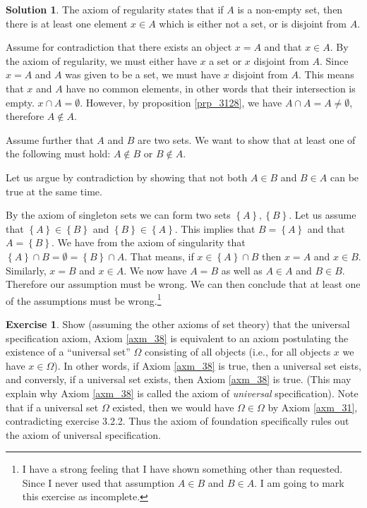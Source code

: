 \documentclass[a4paper, twocolumn]{report}
\newcounter{exercise} \numberwithin{exercise}{section}
\theoremstyle{definition}
\newtheorem{exc}[exercise]{Exercise}
\theoremstyle{solution}
\newtheorem*{sltn}{Solution}
\newcommand{\intrsct}{\cap}
\begin{document}
\begin{sltn}
  The axiom of regularity states that if $A$ is a non-empty set, then there is
  at least one element $x \in A$ which is either not a set, or is disjoint from
  $A$.

  Assume for contradiction that there exists an object $x = A$ and that $x \in
  A$. By the axiom of regularity, we must either have $x$ a set or $x$ disjoint
  from $A$. Since $x = A$ and $A$ was given to be a set, we must have $x$
  disjoint from $A$. This means that $x$ and $A$ have no common elements, in
  other words that their intersection is empty. $x \intrsct A = \emptyset$.
  However, by proposition \ref{prp_3128}, we have $A \intrsct A = A \neq
  \emptyset$, therefore $A \notin A$.

  Assume further that $A$ and $B$ are two sets. We want to show that at least
  one of the following must hold: $A \notin B$ or $B \notin A$.
  
  Let us argue by contradiction by showing that not both $A \in B$ and $B \in
  A$ can be true at the same time.
  
  By the axiom of singleton sets we can form two sets $\left\{ A \right\},
  \left\{ B \right\}$.  Let us assume that $\left\{ A \right\} \in \left\{ B
  \right\}$ and $\left\{ B \right\} \in \left\{ A \right\}$.  This implies that
  $B = \left\{ A \right\}$ and that $A = \left\{ B \right\}$.  We have from the
  axiom of singularity that $\left\{ A \right\} \intrsct B = \emptyset =
  \left\{ B \right\} \intrsct A$.  That means, if $x \in \left\{ A \right\}
  \intrsct B$ then $x = A$ and $x \in B$. Similarly, $x = B$ and $x \in A$.  We
  now have $A = B$ as well as $A \in A$ and $B \in B$. Therefore our assumption
  must be wrong. We can then conclude that at least one of the assumptions must
  be wrong.\footnote{I have a strong feeling that I have shown something other
  than requested. Since I never used that assumption $A \in B$ and $B \in A$. I
am going to mark this exercise as incomplete.}

\end{sltn}

\begin{exc}
  Show (assuming the other axioms of set theory) that the universal
  specification axiom, Axiom \ref{axm_38} is equivalent to an axiom postulating
  the existence of a ``universal set'' $\Omega$ consisting of all objects
  (i.e., for all objects $x$ we have $x \in \Omega$). In other words, if Axiom
  \ref{axm_38} is true, then a universal set eists, and conversly, if a
  universal set exists, then Axiom \ref{axm_38} is true. (This may explain why
  Axiom \ref{axm_38} is called the axiom of \textit{universal} specification).
  Note that if a universal set $\Omega$ existed, then we would have $\Omega \in
  \Omega$ by Axiom \ref{axm_31}, contradicting exercise 3.2.2. Thus the axiom
  of foundation specifically rules out the axiom of universal specification.
\end{exc}
\end{document}
